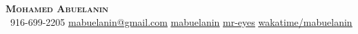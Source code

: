 \begin{center}
    \textbf{\Huge \scshape Mohamed Abuelanin} \\ \vspace{10pt}
     \ \small 916-699-2205 \quad
    \href{mailto:mabuelanin@gmail.com}{ \underline{mabuelanin@gmail.com}} \quad
    \href{https://www.linkedin.com/in/mabuelanin}{ \underline{mabuelanin}} \quad
    \href{https://github.com/mr-eyes}{ \underline{mr-eyes}} \quad
    \href{https://wakatime.com/@mabuelanin}{\seticon{} \underline{wakatime/mabuelanin}} \quad
\end{center}